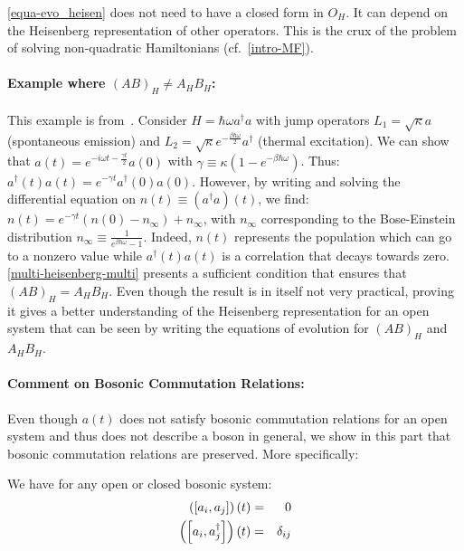 \begin{remark}
    \autoref{equa-evo_heisen} does not need to have a closed form in $O_H$. It can depend on the Heisenberg representation of other operators. This is the crux of the problem of solving non-quadratic Hamiltonians (cf.\@~\autoref{intro-MF}).
\end{remark}


\paragraph{Example where $(A B)_H \neq A_H B_H$:} This example is from~\cite{stack_exch_prod}. Consider $H = \hbar \omega a^\dagger a$ with jump operators $L_1 = \sqrt{\kappa} a$ (spontaneous emission) and $L_2 = \sqrt{\kappa} e^{-\frac{\beta \hbar \omega}{2}} a^\dagger$ (thermal excitation). We can show that $a(t) = e^{-i \omega t -\frac{\gamma t}{2}} a(0)$ with $\gamma \equiv \kappa (1-e^{-\beta \hbar \omega})$. Thus: $a^\dagger(t) a(t) = e^{-\gamma t} a^\dagger(0) a(0)$. However, by writing and solving the differential equation on $n(t) \equiv \left(a^\dagger a\right)(t)$, we find: $n(t) = e^{-\gamma t} (n(0) - n_\infty) + n_\infty$, with $n_\infty$ corresponding to the Bose-Einstein distribution $n_\infty \equiv \frac{1}{e^{\beta \hbar \omega}- 1}$. Indeed, $n(t)$ represents the population which can go to a nonzero value while $a^\dagger(t) a(t)$ is a correlation that decays towards zero. \autoref{multi-heisenberg-multi} presents a sufficient condition that ensures that $(A B)_H = A_H B_H$. Even though the result is in itself not very practical, proving it gives a better understanding of the Heisenberg representation for an open system that can be seen by writing the equations of evolution for $(A B)_H$ and $A_H B_H$.

\paragraph{Comment on Bosonic Commutation Relations:} Even though $a(t)$ does not satisfy bosonic commutation relations for an open system and thus does not describe a boson in general, we show in this part that bosonic commutation relations are preserved. More specifically:

\begin{theorem} \label{comm-preservation}
    We have for any open or closed bosonic system:
    \begin{eqnarray}
        \left(\commutator{a_i}{a_j}\right)(t) &=& 0\\
        \left(\commutator{a_i}{a^\dagger_j}\right)(t) &=& \delta_{i j}
    \end{eqnarray}
\end{theorem}

